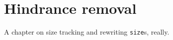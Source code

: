 \chapter{Hindrance removal}
\label{chap:hindrance-removal}

A chapter on size tracking and rewriting \texttt{size}s, really.

